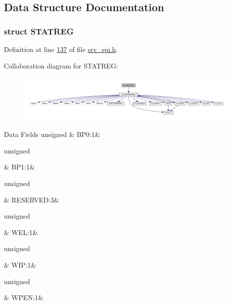 \subsection{Data Structure Documentation}
\label{d8/d7f/a00787}
\hypertarget{a00011_d8/d7f/a00787}{}
\subsubsection{struct S\+T\+A\+T\+R\+E\+G}


Definition at line \hyperlink{a00011_source_l00137}{137} of file \hyperlink{a00011_source}{srv\+\_\+spi.\+h}.



Collaboration diagram for S\+T\+A\+T\+R\+E\+G\+:\nopagebreak
\begin{figure}[H]
\begin{center}
\leavevmode
\includegraphics[width=350pt]{dc/dc8/a01695}
\end{center}
\end{figure}
\begin{DoxyFields}{Data Fields}
\hypertarget{a00011_ab3d9157e202ff59406f5ead250a755c4}{unsigned}\label{a00011_ab3d9157e202ff59406f5ead250a755c4}
&
B\+P0\+:1&
\\
\hline

\hypertarget{a00011_a15cb6e78e0c7f48b64595c2378ea646c}{unsigned}\label{a00011_a15cb6e78e0c7f48b64595c2378ea646c}
&
B\+P1\+:1&
\\
\hline

\hypertarget{a00011_a4ef10d89ed21189c926e11227bab7c3d}{unsigned}\label{a00011_a4ef10d89ed21189c926e11227bab7c3d}
&
R\+E\+S\+E\+R\+V\+E\+D\+:3&
\\
\hline

\hypertarget{a00011_a30c6e84d13356eef9e4d20600c3b5433}{unsigned}\label{a00011_a30c6e84d13356eef9e4d20600c3b5433}
&
W\+E\+L\+:1&
\\
\hline

\hypertarget{a00011_ab9c53087b26832e54862ba3c7b41a05d}{unsigned}\label{a00011_ab9c53087b26832e54862ba3c7b41a05d}
&
W\+I\+P\+:1&
\\
\hline

\hypertarget{a00011_a55afe6de18b91f01a2d525bdf47b8554}{unsigned}\label{a00011_a55afe6de18b91f01a2d525bdf47b8554}
&
W\+P\+E\+N\+:1&
\\
\hline

\end{DoxyFields}
\label{db/db6/a00074}
\hypertarget{a00011_db/db6/a00074}{}
